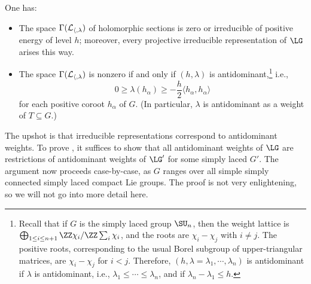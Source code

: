 \begin{theorem}
	One has:
	\begin{itemize}
	\item The space $\Gamma(\cal{L}_{h,\lambda})$ of holomorphic sections is
		zero or irreducible of positive energy of level $h$; moreover, every
		projective irreducible representation of $\LG$ arises this way.
	\item The space $\Gamma(\cal{L}_{h,\lambda})$ is nonzero if and only if
		$(h,\lambda)$ is antidominant,\footnote{Recall that if $G$ is the
		simply laced group $\SU_n$, then the weight lattice is
		$\bigoplus_{1\leq i\leq n+1} \ZZ\chi_i/\ZZ\sum_i \chi_i$, and the
		roots are $\chi_i - \chi_j$ with $i\neq j$. The positive roots,
		corresponding to the usual Borel subgroup of upper-triangular matrices, are
		$\chi_i - \chi_j$ for $i<j$.  Therefore, $(h, \lambda = \lambda_1,
		\cdots, \lambda_n)$ is antidominant if $\lambda$ is antidominant,
		i.e., $\lambda_1 \leq \cdots \leq \lambda_n$, and if $\lambda_n -
		\lambda_1 \leq h$.} i.e.,
		$$0\geq \lambda(h_\alpha) \geq -\frac{h}{2}\langle h_\alpha,
		h_\alpha\rangle$$
		for each positive coroot $h_\alpha$ of $G$. (In particular,
		$\lambda$ is antidominant as a weight of $T\subseteq G$.)
	\end{itemize}
\end{theorem}
The upshot is that irreducible representations correspond to antidominant
weights. To prove , it suffices to show that
all antidominant weights of $\LG$ are restrictions of antidominant weights of
$\LG'$ for some simply laced $G'$. The argument now proceeds case-by-case, as $G$
ranges over all simple simply connected simply laced compact Lie groups. The
proof is not very enlightening, so we will not go into more detail here.


